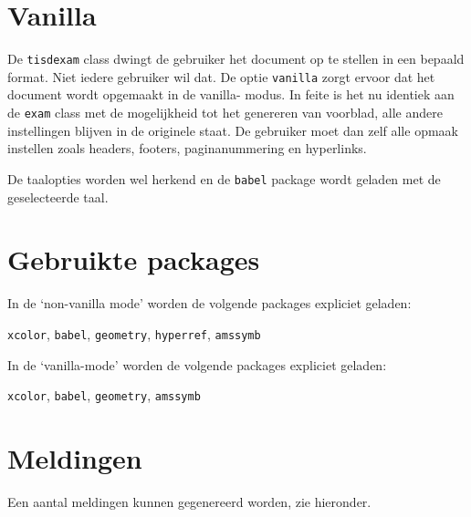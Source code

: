 \documentclass[dutch,a4paper,12pt,addpoints,fleqn,oneside]{tisdexam}
\newcommand\Package[1]{\texttt{#1}}
\newcommand\DocClass[1]{\texttt{#1}}
\newcommand\Option[1]{\texttt{#1}}
\begin{document}
\section{Vanilla}
\label{sec:vanilla}
De \DocClass{tisdexam} class dwingt de gebruiker het document op te stellen
in een bepaald format. Niet iedere gebruiker wil dat. De optie
\Option{vanilla} zorgt ervoor dat het document wordt opgemaakt in de vanilla-%
modus. In feite is het nu identiek aan de \DocClass{exam} class met de
mogelijkheid tot het genereren van voorblad, alle andere instellingen blijven
in de originele staat. De gebruiker moet dan zelf alle opmaak instellen
zoals headers, footers, paginanummering en hyperlinks.

De taalopties worden wel herkend en de \Package{babel} package wordt geladen
met de geselecteerde taal.

\section{Gebruikte packages}
In de `non-vanilla mode' worden de volgende packages expliciet geladen:

\texttt{xcolor}, \texttt{babel}, \texttt{geometry}, \texttt{hyperref}, \texttt{amssymb}

\medskip
In de `vanilla-mode' worden de volgende packages expliciet geladen:

\texttt{xcolor}, \texttt{babel}, \texttt{geometry}, \texttt{amssymb}


\section{Meldingen}
Een aantal meldingen kunnen gegenereerd worden, zie hieronder.
\end{document}
